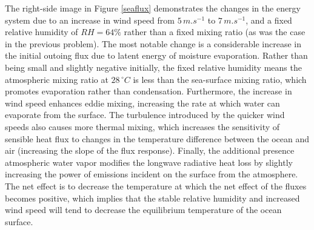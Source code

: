 \documentclass[12pt]{article}
\begin{document}
The right-side image in Figure \ref{seaflux} demonstrates the changes in the energy system due to an increase in wind speed from $5\,\si{m.s^{-1}}$ to $7\,\si{m.s^{-1}}$, and a fixed relative humidity of $RH=64\%$ rather than a fixed mixing ratio (as was the case in the previous problem). The most notable change is a considerable increase in the initial outoing flux due to latent energy of moisture evaporation. Rather than being small and slightly negative initially, the fixed relative humidity means the atmospheric mixing ratio at $28\,\si{^\circ C}$ is less than the sea-surface mixing ratio, which promotes evaporation rather than condensation. Furthermore, the increase in wind speed enhances eddie mixing, increasing the rate at which water can evaporate from the surface. The turbulence introduced by the quicker wind speeds also causes more thermal mixing, which increases the sensitivity of sensible heat flux to changes in the temperature difference between the ocean and air (increasing the slope of the flux response). Finally, the additional presence atmospheric water vapor modifies the longwave radiative heat loss by slightly increasing the power of emissions incident on the surface from the atmosphere. The net effect is to decrease the temperature at which the net effect of the fluxes becomes positive, which implies that the stable relative humidity and increased wind speed will tend to decrease the equilibrium temperature of the ocean surface.
\end{document}
